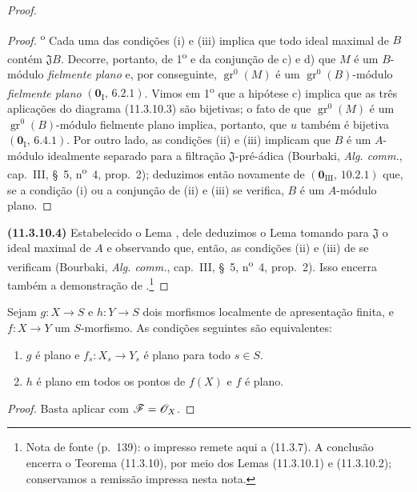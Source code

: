 \begin{proof}
\begin{proof}
\textsuperscript{o} Cada uma das
condições (i) e (iii) implica que
todo ideal maximal de $B$ contém
$\mathfrak JB$. Decorre, portanto, de
1\textsuperscript{o} e da conjunção de
c) e d) que $M$ é um $B$-módulo
\emph{fielmente plano} e, por conseguinte,
$\operatorname{gr}^0(M)$ é um
$\operatorname{gr}^0(B)$-módulo
\emph{fielmente plano}
$(\mathbf 0_{\mathrm I},\,6.2.1)$.
Vimos em 1\textsuperscript{o} que a
hipótese c) implica que as três
aplicações do diagrama (11.3.10.3)
são bijetivas; o fato de que
$\operatorname{gr}^0(M)$ é um
$\operatorname{gr}^0(B)$-módulo fielmente
plano implica, portanto, que $u$
também é bijetiva
$(\mathbf 0_{\mathrm I},\,6.4.1)$.
Por outro lado, as condições (ii) e
(iii) implicam que $B$ é um
$A$-módulo idealmente separado para
a filtração $\mathfrak J$-pré-ádica
(Bourbaki, \emph{Alg. comm.}, cap.~III,
\S~5, n\textsuperscript{o}~4, prop.~2);
deduzimos então novamente de
$(\mathbf 0_{\mathrm{III}},\,10.2.1)$
que, se a condição (i) ou a conjunção
de (ii) e (iii) se verifica, $B$ é
um $A$-módulo plano.
\end{proof}

\label{IV.11.3.10.4}
\noindent\textbf{(11.3.10.4)} Estabelecido
o Lema , dele
deduzimos o Lema 
tomando para $\mathfrak J$ o ideal
maximal de $A$ e observando que,
então, as condições (ii) e (iii) de
 se verificam
(Bourbaki, \emph{Alg. comm.}, cap.~III,
\S~5, n\textsuperscript{o}~4, prop.~2).
Isso encerra também a demonstração
de .\footnote{Nota de fonte (p.~139): o impresso remete aqui a (11.3.7). A conclusão encerra o Teorema (11.3.10), por meio dos Lemas (11.3.10.1) e (11.3.10.2); conservamos a remissão impressa nesta nota.}
\end{proof}

\begin{corollary}[11.3.11]
\label{IV.11.3.11}
Sejam $g:X\to S$ e $h:Y\to S$ dois
morfismos localmente de apresentação
finita, e $f:X\to Y$ um $S$-morfismo.
As condições seguintes são equivalentes:
\begin{enumerate}[label=\emph{\alph*)}]
\item $g$ é plano e
$f_s:X_s\to Y_s$ é plano para todo
$s\in S$.
\item $h$ é plano em todos os pontos
de $f(X)$ e $f$ é plano.
\end{enumerate}
\end{corollary}

\begin{proof}
Basta aplicar  com
$\mathscr{F}=\mathscr{O}_X$.
\end{proof}

